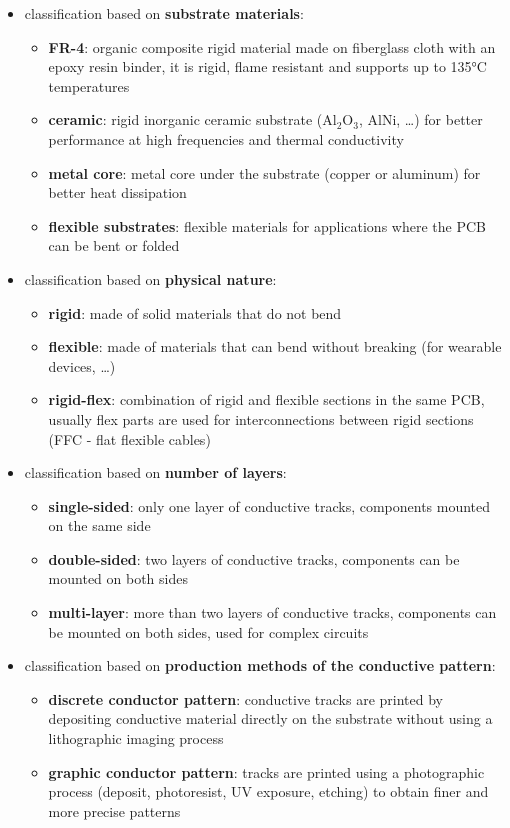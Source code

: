 \begin{itemize}[itemsep=5pt]
	\item classification based on \textbf{substrate materials}:
	\begin{itemize}[topsep=0pt]
		\item \textbf{FR-4}: organic composite rigid material made on fiberglass cloth with an epoxy resin binder, it is rigid,
		flame resistant and supports up to 135°C temperatures
		\item \textbf{ceramic}: rigid inorganic ceramic substrate (Al\(_2\)O\(_3\), AlNi, \dots) for better performance at high
		frequencies and thermal conductivity
		\item \textbf{metal core}: metal core under the substrate (copper or aluminum) for better heat dissipation
		\item \textbf{flexible substrates}: flexible materials for applications where the PCB can be bent or folded
	\end{itemize}
	\item classification based on \textbf{physical nature}:
	\begin{itemize}[topsep=0pt]
		\item \textbf{rigid}: made of solid materials that do not bend
		\item \textbf{flexible}: made of materials that can bend without breaking (for wearable devices, \dots)
		\item \textbf{rigid-flex}: combination of rigid and flexible sections in the same PCB, usually flex parts are used
		for interconnections between rigid sections (FFC - flat flexible cables)
	\end{itemize}
	\item classification based on \textbf{number of layers}:
	\begin{itemize}[topsep=0pt]
		\item \textbf{single-sided}: only one layer of conductive tracks, components mounted on the same side
		\item \textbf{double-sided}: two layers of conductive tracks, components can be mounted on both sides
		\item \textbf{multi-layer}: more than two layers of conductive tracks, components can be mounted on both sides, used for complex circuits
	\end{itemize}
	\item classification based on \textbf{production methods of the conductive pattern}:
	\begin{itemize}[topsep=0pt]
		\item \textbf{discrete conductor pattern}: conductive tracks are printed by depositing conductive material directly
		on the substrate without using a lithographic imaging process
		\item \textbf{graphic conductor pattern}: tracks are printed using a photographic process (deposit, photoresist,
		UV exposure, etching) to obtain finer and more precise patterns
	\end{itemize}
\end{itemize}

